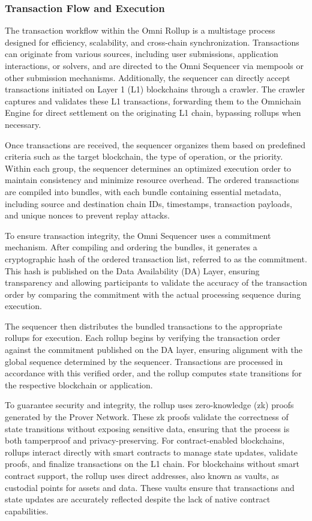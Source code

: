 \subsubsection{Transaction Flow and Execution}  
The transaction workflow within the Omni Rollup is a multistage process designed for efficiency, scalability, and cross-chain synchronization. Transactions can originate from various sources, including user submissions, application interactions, or solvers, and are directed to the Omni Sequencer via mempools or other submission mechanisms. Additionally, the sequencer can directly accept transactions initiated on Layer 1 (L1) blockchains through a crawler. The crawler captures and validates these L1 transactions, forwarding them to the Omnichain Engine for direct settlement on the originating L1 chain, bypassing rollups when necessary.  

Once transactions are received, the sequencer organizes them based on predefined criteria such as the target blockchain, the type of operation, or the priority. Within each group, the sequencer determines an optimized execution order to maintain consistency and minimize resource overhead. The ordered transactions are compiled into bundles, with each bundle containing essential metadata, including source and destination chain IDs, timestamps, transaction payloads, and unique nonces to prevent replay attacks.  

To ensure transaction integrity, the Omni Sequencer uses a commitment mechanism. After compiling and ordering the bundles, it generates a cryptographic hash of the ordered transaction list, referred to as the commitment. This hash is published on the Data Availability (DA) Layer, ensuring transparency and allowing participants to validate the accuracy of the transaction order by comparing the commitment with the actual processing sequence during execution.  

The sequencer then distributes the bundled transactions to the appropriate rollups for execution. Each rollup begins by verifying the transaction order against the commitment published on the DA layer, ensuring alignment with the global sequence determined by the sequencer. Transactions are processed in accordance with this verified order, and the rollup computes state transitions for the respective blockchain or application.  

To guarantee security and integrity, the rollup uses zero-knowledge (zk) proofs generated by the Prover Network. These zk proofs validate the correctness of state transitions without exposing sensitive data, ensuring that the process is both tamperproof and privacy-preserving. For contract-enabled blockchains, rollups interact directly with smart contracts to manage state updates, validate proofs, and finalize transactions on the L1 chain. For blockchains without smart contract support, the rollup uses direct addresses, also known as vaults, as custodial points for assets and data. These vaults ensure that transactions and state updates are accurately reflected despite the lack of native contract capabilities.  

